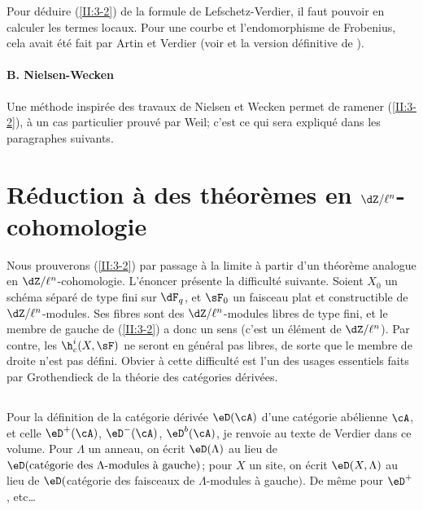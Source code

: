 Pour déduire (\ref{II:3-2}) de la formule de Lefschetz-Verdier, il faut 
pouvoir en calculer les termes locaux. Pour une courbe et l'endomorphisme de 
Frobenius, cela avait été fait par Artin et Verdier (voir \cite{ve67} et la version définitive de \cite{sga5}). 


\paragraph{B. Nielsen-Wecken}
Une méthode inspirée des travaux de Nielsen et Wecken permet de ramener 
(\ref{II:3-2}), à un cas particulier prouvé par Weil; c'est ce qui sera 
expliqué dans les paragraphes suivants. 










\section{Réduction à des théorèmes en \texorpdfstring{$\dZ/\ell^n$}{Z/l n}-cohomologie}\label{II:4}

Nous prouverons (\ref{II:3-2}) par passage à la limite à partir d'un 
théorème analogue en $\dZ/\ell^n$-cohomologie. L'énoncer présente la 
difficulté suivante. Soient $X_0$ un schéma séparé de type fini sur 
$\dF_q$, et $\sF_0$ un faisceau plat et constructible de $\dZ/\ell^n$-modules. 
Ses fibres sont des $\dZ/\ell^n$-modules libres de type fini, et le membre de 
gauche de (\ref{II:3-2}) a donc un sens (c'est un élément de $\dZ/\ell^n$). 
Par contre, les $\h_c^i(X,\sF)$ ne seront en général pas libres, de sorte 
que le membre de droite n'est pas défini. Obvier à cette difficulté est 
l'un des usages essentiels faits par Grothendieck de la théorie des 
catégories dérivées.





\subsection{}\label{II:4-1}

Pour la définition de la catégorie dérivée $\eD(\cA)$ d'une catégorie 
abélienne $\cA$, et celle  $\eD^+(\cA)$, $\eD^-(\cA)$, 
$\eD^b(\cA)$, je renvoie au texte de Verdier dans ce volume. Pour $\Lambda$ 
un anneau, on écrit $\eD(\Lambda)$ au lieu de 
$\eD(\text{catégorie des $\Lambda$-modules à gauche})$; pour $X$ un site, on 
écrit $\eD(X,\Lambda)$ au lieu de 
$\eD($catégorie des faisceaux de $\Lambda$-modules à gauche$)$. De 
même pour $\eD^+$, etc\ldots

